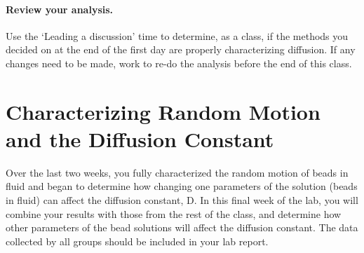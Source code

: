 \paragraph*{Review your analysis.} Use the `Leading a discussion' time to determine, as a class, if the methods you decided on at the end of the first day are properly characterizing diffusion. If any changes need to be made, work to re-do the analysis before the end of this class. 

\section{Characterizing Random Motion and the Diffusion Constant}
Over the last two weeks, you fully characterized the random motion of beads in fluid and began to determine how changing one parameters of the solution (beads in fluid) can affect the diffusion constant, D.
In this final week of the lab, you will combine your results with those from the rest of the class, and determine how other parameters of the bead solutions will affect the diffusion constant.
The data collected by all groups should be included in your lab report.

